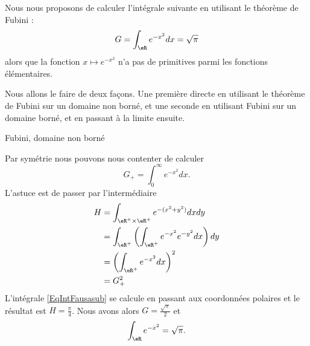 \begin{example}  \label{EXooLUFAooGcxFUW}
	Nous nous proposons de calculer l'intégrale suivante en utilisant le théorème de Fubini :
	\begin{equation}
		G=\int_{\eR} e^{-x^2}dx=\sqrt{ \pi }
	\end{equation}
	alors que la fonction \( x\mapsto  e^{-x^2}\) n'a pas de primitives parmi les fonctions élémentaires.

	Nous allons le faire de deux façons. Une première directe en utilisant le théorème de Fubini sur un domaine non borné, et une seconde en utilisant Fubini sur un domaine borné, et en passant à la limite ensuite.

	\begin{subproof}
		\item[Fubini, domaine non borné]

		Par symétrie nous pouvons nous contenter de calculer
		\begin{equation}
			G_+=\int_0^{\infty} e^{-x^2}dx.
		\end{equation}
		L'astuce est de passer par l'intermédiaire
		\begin{subequations}
			\begin{align}
				H & =\int_{\eR^+\times\eR^+} e^{-(x^2+y^2)}dxdy       \label{EqIntFausasub} \\
				  & =\int_{\eR^+}\left( \int_{\eR^+} e^{-x^2} e^{-y^2}dx \right)dy          \\
				  & =\left( \int_{\eR^+} e^{-x^2} dx\right)^2                               \\
				  & =G_+^2
			\end{align}
		\end{subequations}
		L'intégrale \eqref{EqIntFausasub} se calcule en passant aux coordonnées polaires et le résultat est \( H=\frac{ \pi }{ 4 }\). Nous avons alors \( G=\frac{ \sqrt{\pi} }{ 2 }\) et
		\begin{equation}
			\int_{\eR} e^{-x^2}=\sqrt{\pi}.
		\end{equation}


\end{subproof}
\end{example}
